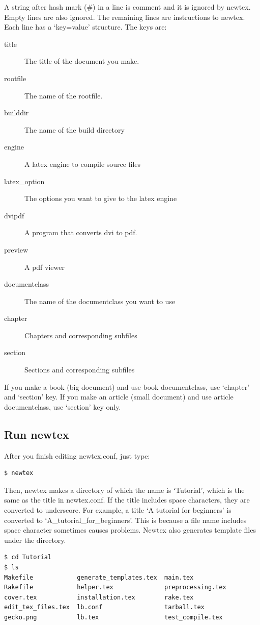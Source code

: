 A string after hash mark (\#) in a line is comment and it is ignored by newtex.
Empty lines are also ignored.
The remaining lines are instructions to newtex.
Each line has a `key=value' structure.
The keys are:
\begin{description}
\item[title] The title of the document you make.
\item[rootfile] The name of the rootfile.
\item[builddir] The name of the build directory
\item[engine] A latex engine to compile source files
\item[latex\_option] The options you want to give to the latex engine
\item[dvipdf] A program that converts dvi to pdf.
\item[preview] A pdf viewer
\item[documentclass] The name of the documentclass you want to use
\item[chapter] Chapters and corresponding subfiles
\item[section] Sections and corresponding subfiles
\end{description}
If you make a book (big document) and use book documentclass, use `chapter' and `section' key.
If you make an article (small document) and use article documentclass, use `section' key only.

\subsection{Run newtex}
After you finish editing newtex.conf, just type:
\begin{verbatim}
$ newtex
\end{verbatim}
Then, newtex makes a directory of which the name is `Tutorial', which is the same as the title in newtex.conf.
If the title includes space characters, they are converted to underscore.
For example, a title `A tutorial for beginners' is converted to `A\_tutorial\_for\_beginners'.
This is because a file name includes space character sometimes causes problems.
Newtex also generates template files under the directory.
\begin{verbatim}
$ cd Tutorial
$ ls
Makefile            generate_templates.tex  main.tex
Rakefile            helper.tex              preprocessing.tex
cover.tex           installation.tex        rake.tex
edit_tex_files.tex  lb.conf                 tarball.tex
gecko.png           lb.tex                  test_compile.tex
\end{verbatim}

